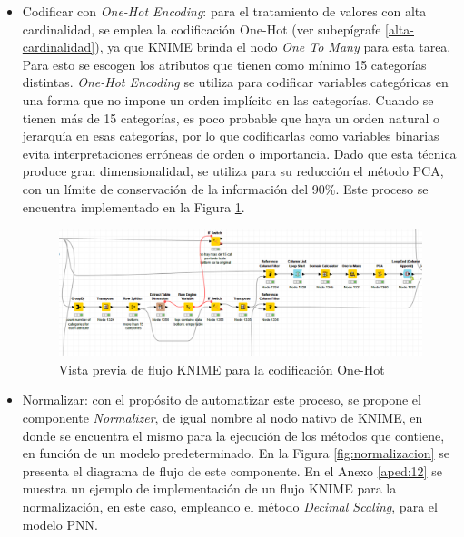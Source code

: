 \begin{itemize}

	\item Codificar con \textit{One-Hot Encoding}: para el tratamiento de valores con alta cardinalidad, se emplea la codificación One-Hot (ver subepígrafe \ref{alta-cardinalidad}), ya que KNIME brinda el nodo \textit{One To Many} para esta tarea. Para esto se escogen los atributos que tienen como mínimo 15 categorías distintas. \textit{One-Hot Encoding} se utiliza para codificar variables categóricas en una forma que no impone un orden implícito en las categorías. Cuando se tienen más de 15 categorías, es poco probable que haya un orden natural o jerarquía en esas categorías, por lo que codificarlas como variables binarias evita interpretaciones erróneas de orden o importancia. Dado que esta técnica produce gran dimensionalidad, se utiliza para su reducción el método PCA, con un límite de conservación de la información del 90\%. Este proceso se encuentra implementado en la Figura \ref{fig:one-hot-flujo}.
	
	\begin{figure}[H]
		\centering
		\includegraphics[width=1\linewidth]{"figuras/capi 2/preprocesado/one-hot-flujo"}
		\caption{Vista previa de flujo KNIME para la codificación One-Hot}
		\label{fig:one-hot-flujo}
	\end{figure}
	
	\item Normalizar: con el propósito de automatizar este proceso, se propone el componente \textit{Normalizer}, de igual nombre al nodo nativo de KNIME, en donde se encuentra el mismo para la ejecución de los métodos que contiene, en función de un modelo predeterminado. En la Figura \ref{fig:normalizacion} se presenta el diagrama de flujo de este componente. En el Anexo \ref{aped:12} se muestra un ejemplo de implementación de un flujo KNIME para la normalización, en este caso, empleando el método \textit{Decimal Scaling}, para el modelo PNN.

\end{itemize}

